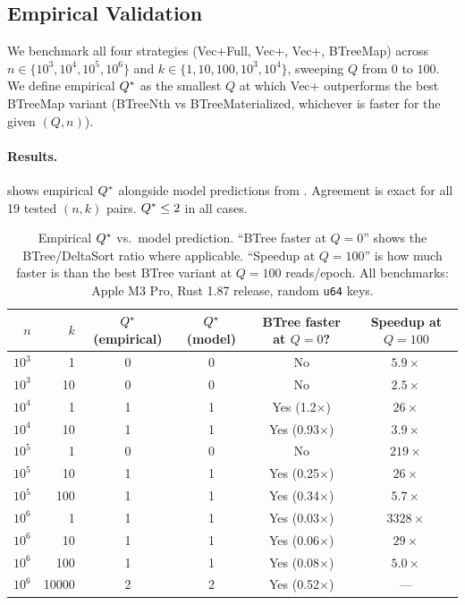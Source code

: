 \subsection{Empirical Validation}

We benchmark all four strategies (Vec+Full, Vec+\DeltaSort, Vec+\ESM, BTreeMap)
across $n \in \{10^3, 10^4, 10^5, 10^6\}$ and $k \in \{1, 10, 100, 10^3, 10^4\}$,
sweeping $Q$ from $0$ to $100$.
We define empirical $Q^*$ as the smallest $Q$ at which Vec+\DeltaSort
outperforms the best BTreeMap variant (BTreeNth vs BTreeMaterialized, whichever
is faster for the given $(Q, n)$).

\paragraph{Results.}
 shows empirical $Q^*$ alongside model predictions from
.
Agreement is exact for all 19 tested $(n,k)$ pairs.
$Q^* \leq 2$ in all cases.

\begin{table}[H]
\centering
\small
\setlength{\tabcolsep}{6pt}
\begin{tabular}{@{}rr|cc|cc@{}}
\toprule
$n$ & $k$ & $Q^*$ (empirical) & $Q^*$ (model) &
      BTree faster at $Q=0$? & Speedup at $Q=100$ \\
\midrule
$10^3$ & 1    & 0 & 0 & No        & $5.9\times$ \\
$10^3$ & 10   & 0 & 0 & No        & $2.5\times$ \\
$10^4$ & 1    & 1 & 1 & Yes (1.2$\times$) & $26\times$ \\
$10^4$ & 10   & 1 & 1 & Yes (0.93$\times$)& $3.9\times$ \\
$10^5$ & 1    & 0 & 0 & No        & $219\times$ \\
$10^5$ & 10   & 1 & 1 & Yes (0.25$\times$)& $26\times$ \\
$10^5$ & 100  & 1 & 1 & Yes (0.34$\times$)& $5.7\times$ \\
$10^6$ & 1    & 1 & 1 & Yes (0.03$\times$)& $3328\times$ \\
$10^6$ & 10   & 1 & 1 & Yes (0.06$\times$)& $29\times$ \\
$10^6$ & 100  & 1 & 1 & Yes (0.08$\times$)& $5.0\times$ \\
$10^6$ & 10000& 2 & 2 & Yes (0.52$\times$)& --- \\
\bottomrule
\end{tabular}
\caption{%
  Empirical $Q^*$ vs.\ model prediction.
  ``BTree faster at $Q=0$'' shows the BTree/DeltaSort ratio where applicable.
  ``Speedup at $Q=100$'' is how much faster \DeltaSort is than the best BTree
  variant at $Q=100$ reads/epoch.
  All benchmarks: Apple M3 Pro, Rust 1.87 release, random \texttt{u64} keys.
}
\label{tab:qbreak}
\end{table}

